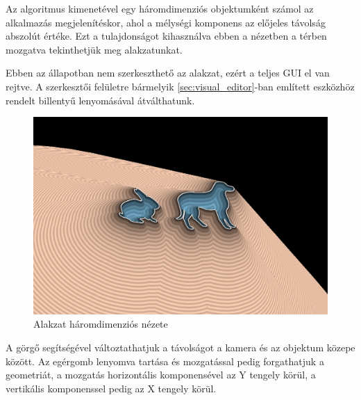 Az algoritmus kimenetével egy háromdimenziós objektumként számol az alkalmazás megjelenítéskor, ahol a mélységi komponens az előjeles távolság abszolút értéke. Ezt a tulajdonságot kihasználva ebben a nézetben a térben mozgatva tekinthetjük meg alakzatunkat.

Ebben az állapotban nem szerkeszthető az alakzat, ezért a teljes GUI el van rejtve. A szerkesztői felületre bármelyik \ref{sec:visual_editor}-ban említett eszközhöz rendelt billentyű lenyomásával átválthatunk.

\begin{figure}[H]
    \centering
    \includegraphics[width=1\linewidth]{images/3d_view.png}
    \caption{Alakzat háromdimenziós nézete}
    \label{fig:3d_view-1}
\end{figure}

A görgő segítségével változtathatjuk a távolságot a kamera és az objektum közepe között. Az egérgomb lenyomva tartása és mozgatással pedig forgathatjuk a geometriát, a mozgatás horizontális komponensével az Y tengely körül, a vertikális komponenssel pedig az X tengely körül.

